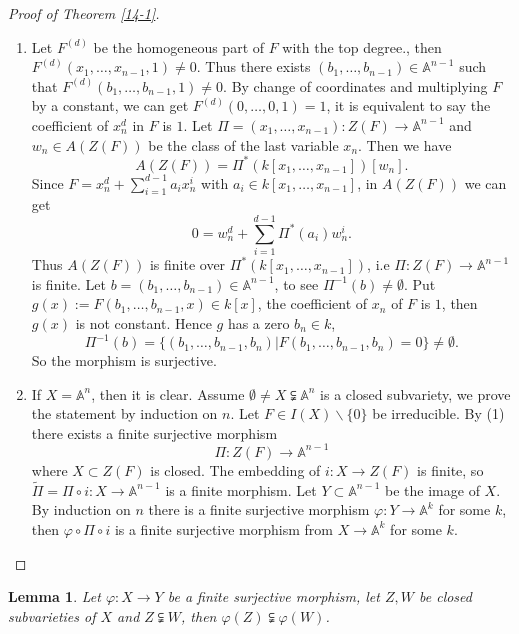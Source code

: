 \documentclass{amsart}
\theoremstyle{plain}
\newtheorem{lemma}{Lemma}
\theoremstyle{definition}
\theoremstyle{remark}
\numberwithin{equation}{section}
\begin{document}
\begin{proof}[Proof of Theorem \ref{14-1}]
	\begin{enumerate}
		\item Let $ F^{(d)} $ be the homogeneous part of $ F $ with the top degree., then $ F^{(d)}(x_1,\dots,x_{n-1},1)\neq 0 $. Thus there exists $ (b_1,\dots,b_{n-1})\in \mathbb{A}^{n-1} $ such that $ F^{(d)}(b_1,\dots,b_{n-1},1)\neq 0 $. By change of coordinates and multiplying $ F $ by a constant, we can get $ F^{(d)}(0,\dots,0,1)=1 $, it is equivalent to say the coefficient of $ x_n^d $ in $ F $ is $ 1 $. Let $ \Pi=(x_1,\dots,x_{n-1}):Z(F)\to \mathbb{A}^{n-1} $ and $ w_n\in A(Z(F)) $ be the class of the last variable $ x_n $. Then we have 
		$$
		A(Z(F))=\Pi^\ast (k[x_1,\dots,x_{n-1}])[w_n].
		$$ 
		Since $ F=x_n^d+\sum\limits_{i=1}^{d-1}a_ix_n^i $ with $ a_i\in k[x_1,\dots,x_{n-1}] $, in $ A(Z(F)) $ we can get 
		$$
		0=w_n^d+\sum\limits_{i=1}^{d-1}\Pi^\ast (a_i)w_n^i.
		$$
		Thus $ A(Z(F)) $ is finite over $ \Pi^\ast(k[x_1,\dots,x_{n-1}]) $, i.e $ \Pi:Z(F)\to \mathbb{A}^{n-1} $ is finite. Let $ b=(b_1,\dots,b_{n-1})\in \mathbb{A}^{n-1} $, to see $ \Pi^{-1}(b)\neq \emptyset $. Put $ g(x):=F(b_1,\dots,b_{n-1},x)\in k[x] $, the coefficient of $ x_n $ of $ F $ is $ 1 $, then $ g(x) $ is not constant. Hence $ g $ has a zero $ b_n\in k $, 
		$$
		\Pi^{-1}(b)=\lbrace (b_1,\dots,b_{n-1},b_n)|F(b_1,\dots,b_{n-1},b_n)=0 \rbrace \neq \emptyset.
		$$
		So the morphism is surjective.
		\item If $ X=\mathbb{A}^{n} $, then it is clear. Assume $ \emptyset\neq X\subsetneqq\mathbb{A}^n $ is a closed subvariety, we prove the statement by induction on $ n $. Let $ F\in I(X)\backslash\lbrace 0 \rbrace $ be irreducible. By (1) there exists a finite surjective morphism
		$$
		\Pi:Z(F)\to \mathbb{A}^{n-1}
		$$
		where $ X\subset Z(F) $ is closed. The embedding of $ i:X\to Z(F) $ is finite, so $ \tilde{\Pi}=\Pi\circ i:X\to \mathbb{A}^{n-1} $ is a finite morphism. Let $ Y\subset \mathbb{A}^{n-1} $ be the image of $ X $. By induction on $ n $ there is a finite surjective morphism $ \varphi:Y\to \mathbb{A}^{k} $ for some $ k $, then $ \varphi\circ\Pi\circ i $ is a finite surjective morphism from $ X\to \mathbb{A}^{k} $ for some $ k $.
	\end{enumerate}
\end{proof}
\begin{lemma}\label{14-2}
	Let $ \varphi:X\to Y $ be a finite surjective morphism, let $ Z,W $ be closed subvarieties of $ X $ and $ Z\subsetneqq W $, then $ \varphi(Z)\subsetneqq \varphi(W) $. 
\end{lemma}
\end{document}
